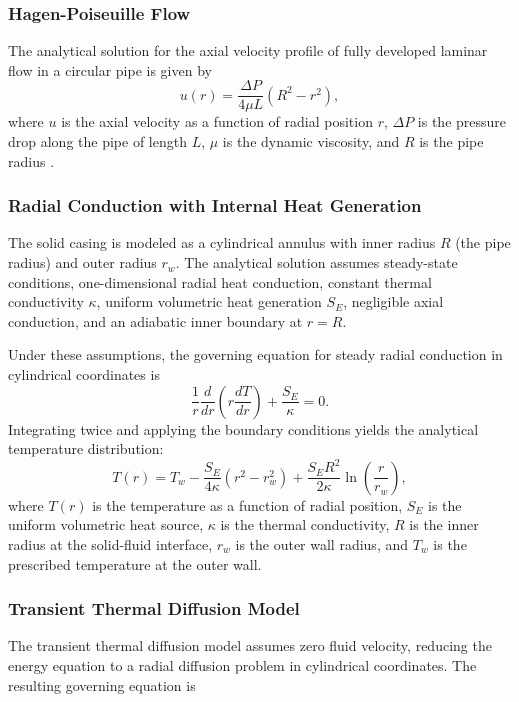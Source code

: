 \subsubsection{Hagen-Poiseuille Flow}
The analytical solution for the axial velocity profile of fully developed laminar flow in a circular pipe is given by
\begin{equation}
    u(r) = \frac{\Delta P}{4 \mu L} \left( R^2 - r^2 \right),
\label{eq:poiseuille}
\end{equation}
where $u$ is the axial velocity as a function of radial position $r$, $\Delta P$ is the pressure drop along the pipe of length $L$, $\mu$ is the dynamic viscosity, and $R$ is the pipe radius \cite{hagenPoisueille, heat_transfer}. 

\subsubsection{Radial Conduction with Internal Heat Generation}
The solid casing is modeled as a cylindrical annulus with inner radius $R$ (the pipe radius) and outer radius $r_w$. The analytical solution assumes steady-state conditions, one-dimensional radial heat conduction, constant thermal conductivity $\kappa$, uniform volumetric heat generation $S_E$, negligible axial conduction, and an adiabatic inner boundary at $r = R$.

Under these assumptions, the governing equation for steady radial conduction in cylindrical coordinates is
\begin{equation}
\frac{1}{r}\frac{d}{dr}\left(r \frac{dT}{dr}\right) + \frac{S_E}{\kappa} = 0.
\end{equation}
Integrating twice and applying the boundary conditions yields the analytical temperature distribution:
\begin{equation}
T(r) = T_w 
- \frac{S_E}{4\kappa}(r^2 - r_w^2)
+ \frac{S_E R^2}{2\kappa} 
\ln\left(\frac{r}{r_w}\right),
\label{eq:solid_conduction}
\end{equation}
where $T(r)$ is the temperature as a function of radial position, $S_E$ is the uniform volumetric heat source, $\kappa$ is the thermal conductivity, $R$ is the inner radius at the solid-fluid interface, $r_w$ is the outer wall radius, and $T_w$ is the prescribed temperature at the outer wall.

\subsubsection{Transient Thermal Diffusion Model}
The transient thermal diffusion model assumes zero fluid velocity, reducing the energy equation to a radial diffusion problem in cylindrical coordinates. The resulting governing equation is

